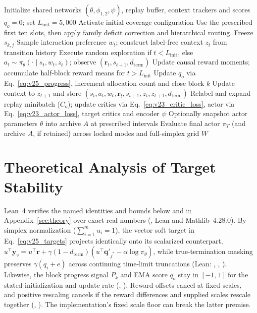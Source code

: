\begin{algorithm}[!htbp]
\caption{BAMOR training with quota-regulated portfolio allocation}
\label{alg:bamor}
\label{sec:algorithm}
\begin{algorithmic}[1]
\STATE Initialize shared networks $(\theta, \phi_{1,2}, \psi)$, replay buffer, context trackers and scores $q_o = 0$; set $L_{\mathrm{init}} = 5{,}000$
  \STATE Activate initial coverage configuration
  \STATE Use the prescribed first ten slots, then apply family deficit correction and hierarchical routing. Freeze $s_{k,j}$
 \ENDIF
 \STATE Sample interaction preference $w_t$; construct label-free context $z_t$ from transition history
 \STATE Execute random exploration if $t < L_{\mathrm{init}}$, else $a_t \sim \pi_\theta(\cdot \mid s_t, w_t, z_t)$; observe $(\mathbf{r}_t, s_{t+1}, d_{\mathrm{term}})$
 \STATE Update causal reward moments; accumulate half-block reward means for $t > L_{\mathrm{init}}$
  \STATE Update $q_o$ via Eq.~\eqref{eq:v25_progress}, increment allocation count and close block $k$
 \ENDIF
 \STATE Update context to $z_{t+1}$ and store $(s_t,a_t,w_t,\mathbf{r}_t,s_{t+1},z_t,z_{t+1},d_{\mathrm{term}})$
  \STATE Relabel and expand replay minibatch ($C_o$); update critics via Eq.~\eqref{eq:v23_critic_loss}, actor via Eq.~\eqref{eq:v23_actor_loss}, target critics and encoder $\psi$
 \ENDIF
 \STATE Optionally snapshot actor parameters $\theta$ into archive $A$ at prescribed intervals
\ENDFOR
\STATE Evaluate final actor $\pi_T$ (and archive $A$, if retained) across locked modes and full-simplex grid $W$
\end{algorithmic}
\end{algorithm}

\FloatBarrier
\section{Theoretical Analysis of Target Stability}
\label{sec:theory_main}

Lean~4 verifies the named identities and bounds below and in
Appendix~\ref{sec:theory} over exact real numbers
(, Lean and Mathlib~4.28.0). By simplex
normalization ($\sum_{i=1}^m u_i = 1$),
the vector soft target in Eq.~\eqref{eq:v25_targets} projects identically onto
its scalarized counterpart, $u^\top\mathbf{y}_v = u^\top\mathbf{r} + \gamma(1 - d_{\mathrm{term}})(u^\top\mathbf{q}'_{j^*} - \alpha\log\pi_\theta)$,
while true-termination masking preserves $\gamma(q_i + e)$ across continuing
time-limit truncations (Lean: , ,
). Likewise, the block progress signal $P_k$
and EMA score $q_o$ stay in $[-1,1]$ for the stated initialization and update
rate (, ). Reward offsets
cancel at fixed scales, and positive rescaling cancels if the reward differences
and supplied scales rescale together (,
). The implementation's fixed scale floor
can break the latter premise.

